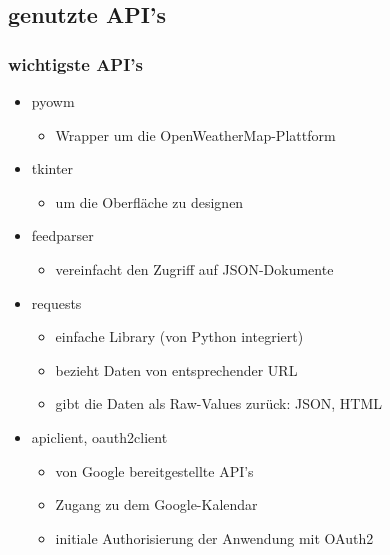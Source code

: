 \documentclass[11pt]{beamer}
\begin{document}
	\subsection{genutzte API's}
	\begin{frame}
		\frametitle{wichtigste API's}
		\begin{itemize}[<+->]
			\item pyowm
			\begin{itemize}[<.>]
				\item Wrapper um die OpenWeatherMap-Plattform
			\end{itemize}
			\item tkinter 
				\begin{itemize}[<.>]
					\item um die Oberfl\"ache zu designen
				\end{itemize}
			\item feedparser
				\begin{itemize}[<.>]
					\item vereinfacht den Zugriff auf JSON-Dokumente
				\end{itemize}
			\item requests
				\begin{itemize}[<.>]
					\item einfache Library (von Python integriert)
					\item bezieht Daten von entsprechender URL
					\item gibt die Daten als Raw-Values zur\"uck: JSON, HTML
				\end{itemize}
			\item apiclient, oauth2client
			\begin{itemize}[<.>]
				\item von Google bereitgestellte API's
				\item Zugang zu dem Google-Kalendar
				\item initiale Authorisierung der Anwendung mit OAuth2
			\end{itemize}
		\end{itemize}
	\end{frame}
\end{document}
